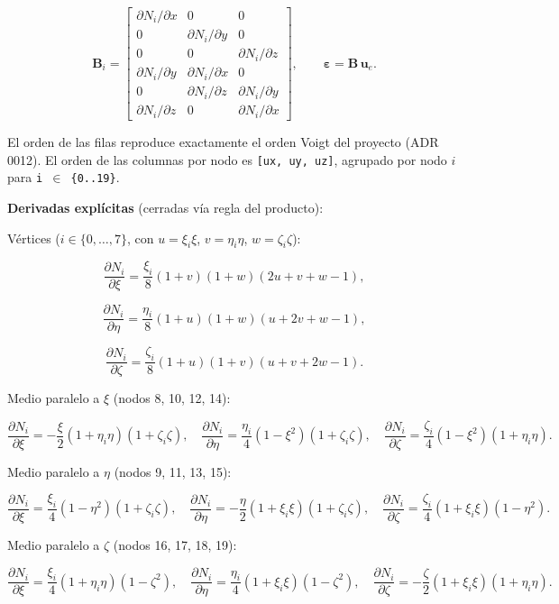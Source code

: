 \documentclass[11pt,letterpaper,oneside]{report}
\begin{document}
\[
\mathbf B_i = \begin{bmatrix}
\partial N_i / \partial x & 0 & 0 \\
0 & \partial N_i / \partial y & 0 \\
0 & 0 & \partial N_i / \partial z \\
\partial N_i / \partial y & \partial N_i / \partial x & 0 \\
0 & \partial N_i / \partial z & \partial N_i / \partial y \\
\partial N_i / \partial z & 0 & \partial N_i / \partial x
\end{bmatrix}, \qquad \boldsymbol\varepsilon = \mathbf B\,\mathbf u_e.
\]

El orden de las filas reproduce exactamente el orden Voigt del proyecto (ADR 0012). El orden de las columnas por nodo es \texttt{[ux, uy, uz]}, agrupado por nodo $i$ para \texttt{i \ensuremath{\in} \{0..19\}}.

\textbf{Derivadas explícitas} (cerradas vía regla del producto):

Vértices ($i \in \{0,\dots,7\}$, con $u = \xi_i\xi$, $v = \eta_i\eta$, $w = \zeta_i\zeta$):

\[
\frac{\partial N_i}{\partial \xi} = \frac{\xi_i}{8}(1 + v)(1 + w)(2u + v + w - 1),
\]

\[
\frac{\partial N_i}{\partial \eta} = \frac{\eta_i}{8}(1 + u)(1 + w)(u + 2v + w - 1),
\]

\[
\frac{\partial N_i}{\partial \zeta} = \frac{\zeta_i}{8}(1 + u)(1 + v)(u + v + 2w - 1).
\]

Medio paralelo a $\xi$ (nodos 8, 10, 12, 14):

\[
\frac{\partial N_i}{\partial \xi} = -\frac{\xi}{2}(1 + \eta_i\eta)(1 + \zeta_i\zeta),\quad \frac{\partial N_i}{\partial \eta} = \frac{\eta_i}{4}(1 - \xi^2)(1 + \zeta_i\zeta),\quad \frac{\partial N_i}{\partial \zeta} = \frac{\zeta_i}{4}(1 - \xi^2)(1 + \eta_i\eta).
\]

Medio paralelo a $\eta$ (nodos 9, 11, 13, 15):

\[
\frac{\partial N_i}{\partial \xi} = \frac{\xi_i}{4}(1 - \eta^2)(1 + \zeta_i\zeta),\quad \frac{\partial N_i}{\partial \eta} = -\frac{\eta}{2}(1 + \xi_i\xi)(1 + \zeta_i\zeta),\quad \frac{\partial N_i}{\partial \zeta} = \frac{\zeta_i}{4}(1 + \xi_i\xi)(1 - \eta^2).
\]

Medio paralelo a $\zeta$ (nodos 16, 17, 18, 19):

\[
\frac{\partial N_i}{\partial \xi} = \frac{\xi_i}{4}(1 + \eta_i\eta)(1 - \zeta^2),\quad \frac{\partial N_i}{\partial \eta} = \frac{\eta_i}{4}(1 + \xi_i\xi)(1 - \zeta^2),\quad \frac{\partial N_i}{\partial \zeta} = -\frac{\zeta}{2}(1 + \xi_i\xi)(1 + \eta_i\eta).
\]
\end{document}
